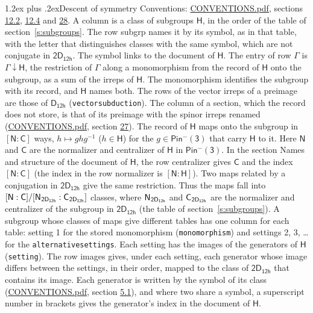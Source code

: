 \documentclass[10pt,a4paper]{article}
\makeatletter
\renewcommand\section{\@startsection{section}{1}{\z@}{-3ex plus -1ex minus -.2ex}%
  {1.2ex plus .2ex}{\normalfont\large\sffamily\bfseries\color{parttitle}}}
\numberwithin{equation}{section}
\newcommand{\grp}[1]{\mathsf{#1}}
\newcommand{\grpindex}[2]{[#1 : #2]}
\newcommand{\restr}[2]{#1\!\downarrow#2}
\newcommand{\hairsp}{\mkern1mu}
\makeatother
\begin{document}
\section{Descent of symmetry}\label{s:subduction}
Conventions: \href{../../CONVENTIONS.pdf}{CONVENTIONS.pdf}, sections \href{../../../rotation/CONVENTIONS.pdf\#conv.12.2}{12.2}, \href{../../../rotation/CONVENTIONS.pdf\#conv.12.4}{12.4} and \href{../../CONVENTIONS.pdf\#conv.28}{28}.
A column is a class of subgroups $\grp{H}$, in the order of the table of section~\ref{s:subgroups}. The row subgrp names it by its symbol, as in that table, with the letter that distinguishes classes with the same symbol, which are not conjugate in $\grp{2D_{12h}}$. The symbol links to the document of $\grp{H}$. The entry of row $\Gamma$ is $\restr{\Gamma}{\grp{H}}$, the restriction of $\Gamma$ along a monomorphism from the record of $\grp{H}$ onto the subgroup, as a sum of the irreps of $\grp{H}$. The monomorphism identifies the subgroup with its record, and $\grp{H}$ names both. The rows of the vector irreps of a preimage are those of \href{../../../rotation/data/pdf/D12h.pdf}{$\grp{D_{12h}}$} (\texttt{vectorsubduction}). The column of a section, which the record does not store, is that of its preimage with the spinor irreps renamed (\href{../../CONVENTIONS.pdf}{CONVENTIONS.pdf}, section \href{../../CONVENTIONS.pdf\#conv.27}{27}). \label{n:group.normalizer.o3}\label{n:group.centralizer.o3}\label{n:element.h}The record of $\grp{H}$ maps onto the subgroup in $\grpindex{\grp{N}}{\grp{C}}$ ways, $h \mapsto g h g^{-1}$ ($h \in \grp{H}$) for the $g \in \grp{Pin^{-}(3)}$ that carry $\grp{H}$ to it. Here $\grp{N}$ and $\grp{C}$ are the normalizer and centralizer of $\grp{H}$ in \href{Pinminus3.pdf}{$\grp{Pin^{-}(3)}$}. In the section Names and structure of the document of $\grp{H}$, the row centralizer gives $\grp{C}$ and the index $\grpindex{\grp{N}}{\grp{C}}$ (the index in the row normalizer is $\grpindex{\grp{N}}{\grp{H}}$). Two maps related by a conjugation in $\grp{2D_{12h}}$ give the same restriction. Thus the maps fall into $\grpindex{\grp{N}}{\grp{C}}/\grpindex{\grp{N}_{\hairsp \grp{2D_{12h}}}}{\grp{C}_{\hairsp \grp{2D_{12h}}}}$ classes, where $\grp{N}_{\hairsp \grp{2D_{12h}}}$ and $\grp{C}_{\hairsp \grp{2D_{12h}}}$ are the normalizer and centralizer of the subgroup in $\grp{2D_{12h}}$ (the table of section~\ref{s:subgroups}). \label{n:head.setting}A subgroup whose classes of maps give different tables has one column for each table: setting 1 for the stored monomorphism (\texttt{monomorphism}) and settings 2, 3, \dots{} for the \texttt{alternativesettings}. Each setting has the images of the generators of $\grp{H}$ (\texttt{setting}). \label{n:head.images}The row images gives, under each setting, each generator whose image differs between the settings, in their order, mapped to the class of $\grp{2D_{12h}}$ that contains its image. \label{n:element.generator.index}Each generator is written by the symbol of its class (\href{../../CONVENTIONS.pdf}{CONVENTIONS.pdf}, section \href{../../../rotation/CONVENTIONS.pdf\#conv.5.1}{5.1}), and where two share a symbol, a superscript number in brackets gives the generator's index in the document of $\grp{H}$. 
\end{document}

